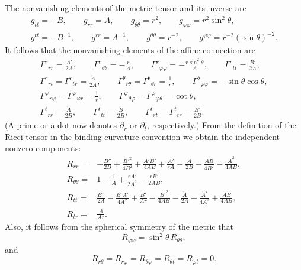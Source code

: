 The nonvanishing elements of the metric tensor and its inverse are
\begin{equation}
  \begin{gathered}
  g_{tt}=-B,\qquad
  g_{rr}=A,\qquad
  g_{\theta\theta}=r^2,\qquad
  g_{\varphi\varphi}=r^2\sin^2\theta,\\
  g^{tt}=-B^{-1},\qquad
  g^{rr}=A^{-1},\qquad
  g^{\theta\theta}=r^{-2},\qquad
  g^{\varphi\varphi}=r^{-2}(\sin\theta)^{-2}.
  \end{gathered}
  \tag{11.7.2}\label{eq:11.7.2}
\end{equation}
It follows that the nonvanishing elements of the affine connection are
\begin{equation}
  \begin{gathered}
  \Gamma^r{}_{rr}=\frac{A'}{2A},\qquad
  \Gamma^r{}_{\theta\theta}=-\frac rA,\qquad
  \Gamma^r{}_{\varphi\varphi}=-\frac{r\sin^2\theta}{A},\qquad
  \Gamma^r{}_{tt}=\frac{B'}{2A},\\
  \Gamma^r{}_{rt}=\Gamma^r{}_{tr}=\frac{\dot A}{2A},\qquad
  \Gamma^\theta{}_{r\theta}=\Gamma^\theta{}_{\theta r}=\frac1r,\qquad
  \Gamma^\theta{}_{\varphi\varphi}=-\sin\theta\cos\theta,\\
  \Gamma^\varphi{}_{r\varphi}=\Gamma^\varphi{}_{\varphi r}=\frac1r,\qquad
  \Gamma^\varphi{}_{\theta\varphi}
  =\Gamma^\varphi{}_{\varphi\theta}=\cot\theta,\\
  \Gamma^t{}_{rr}=\frac{\dot A}{2B},\qquad
  \Gamma^t{}_{tt}=\frac{\dot B}{2B},\qquad
  \Gamma^t{}_{rt}=\Gamma^t{}_{tr}=\frac{B'}{2B}.
  \end{gathered}
  \tag{11.7.3}\label{eq:11.7.3}
\end{equation}
(A prime or a dot now denotes \(\partial_r\) or \(\partial_t\),
respectively.) From the definition of the Ricci tensor in the binding
curvature convention we obtain the independent nonzero components:
\begin{align}
  R_{rr}
  ={}&
  -\frac{B''}{2B}
  +\frac{B'^2}{4B^2}
  +\frac{A'B'}{4AB}
  +\frac{A'}{rA}
  +\frac{\ddot A}{2B}
  -\frac{\dot A\dot B}{4B^2}
  -\frac{\dot A^2}{4AB},
  \tag{11.7.4}\label{eq:11.7.4}\\
  R_{\theta\theta}
  ={}&
  1-\frac1A+\frac{rA'}{2A^2}-\frac{rB'}{2AB},
  \tag{11.7.5}\label{eq:11.7.5}\\
  R_{tt}
  ={}&
  \frac{B''}{2A}
  -\frac{B'A'}{4A^2}
  +\frac{B'}{Ar}
  -\frac{B'^2}{4AB}
  -\frac{\ddot A}{2A}
  +\frac{\dot A^2}{4A^2}
  +\frac{\dot A\dot B}{4AB},
  \tag{11.7.6}\label{eq:11.7.6}\\
  R_{tr}
  ={}&
  \frac{\dot A}{Ar}.
  \tag{11.7.7}\label{eq:11.7.7}
\end{align}
Also, it follows from the spherical symmetry of the metric that
\begin{equation}
  R_{\varphi\varphi}=\sin^2\theta\,R_{\theta\theta},
  \tag{11.7.8}\label{eq:11.7.8}
\end{equation}
and
\begin{equation}
  R_{r\theta}=R_{r\varphi}=R_{\theta\varphi}
  =R_{\theta t}=R_{\varphi t}=0.
  \tag{11.7.9}\label{eq:11.7.9}
\end{equation}

